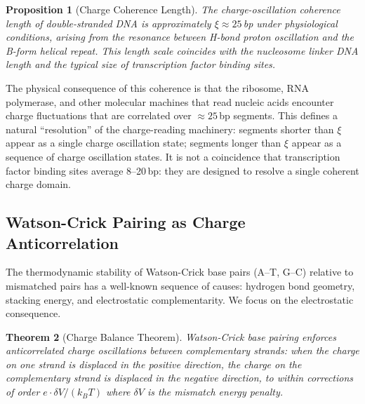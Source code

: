 \documentclass[12pt,a4paper]{article}
\newtheorem{theorem}{Theorem}[section]
\newtheorem{proposition}[theorem]{Proposition}
\theoremstyle{definition}
\theoremstyle{remark}
\begin{document}
\begin{proposition}[Charge Coherence Length]
The charge-oscillation coherence length of double-stranded DNA is approximately $\xi \approx 25$\,bp under physiological conditions, arising from the resonance between H-bond proton oscillation and the B-form helical repeat. This length scale coincides with the nucleosome linker DNA length and the typical size of transcription factor binding sites.
\label{prop:coherence}
\end{proposition}

The physical consequence of this coherence is that the ribosome, RNA polymerase, and other molecular machines that read nucleic acids encounter charge fluctuations that are correlated over $\approx 25$\,bp segments. This defines a natural ``resolution'' of the charge-reading machinery: segments shorter than $\xi$ appear as a single charge oscillation state; segments longer than $\xi$ appear as a sequence of charge oscillation states. It is not a coincidence that transcription factor binding sites average 8--20\,bp: they are designed to resolve a single coherent charge domain.

\subsection{Watson-Crick Pairing as Charge Anticorrelation}

The thermodynamic stability of Watson-Crick base pairs (A--T, G--C) relative to mismatched pairs has a well-known sequence of causes: hydrogen bond geometry, stacking energy, and electrostatic complementarity. We focus on the electrostatic consequence.

\begin{theorem}[Charge Balance Theorem]
Watson-Crick base pairing enforces anticorrelated charge oscillations between complementary strands: when the charge on one strand is displaced in the positive direction, the charge on the complementary strand is displaced in the negative direction, to within corrections of order $e \cdot \delta V / (k_B T)$ where $\delta V$ is the mismatch energy penalty.
\label{thm:charge_balance}
\end{theorem}
\end{document}
